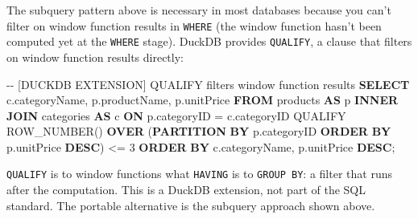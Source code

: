 \documentclass[
  letterpaper,
  DIV=11,
  numbers=noendperiod]{scrreprt}
\newenvironment{Shaded}{\begin{snugshade}}{\end{snugshade}}
\newcommand{\CommentTok}[1]{\textcolor[rgb]{0.37,0.37,0.37}{#1}}
\newcommand{\DecValTok}[1]{\textcolor[rgb]{0.68,0.00,0.00}{#1}}
\newcommand{\FunctionTok}[1]{\textcolor[rgb]{0.28,0.35,0.67}{#1}}
\newcommand{\KeywordTok}[1]{\textcolor[rgb]{0.00,0.23,0.31}{\textbf{#1}}}
\newcommand{\NormalTok}[1]{\textcolor[rgb]{0.00,0.23,0.31}{#1}}
\newcommand{\OperatorTok}[1]{\textcolor[rgb]{0.37,0.37,0.37}{#1}}
\begin{document}
\begin{tcolorbox}[enhanced jigsaw, opacitybacktitle=0.6, arc=.35mm, colback=white, bottomtitle=1mm, opacityback=0, toprule=.15mm, left=2mm, colbacktitle=quarto-callout-tip-color!10!white, breakable, coltitle=black, toptitle=1mm, colframe=quarto-callout-tip-color-frame, bottomrule=.15mm, titlerule=0mm, title=\textcolor{quarto-callout-tip-color}{\faLightbulb}\hspace{0.5em}{DuckDB's QUALIFY Clause}, rightrule=.15mm, leftrule=.75mm]

The subquery pattern above is necessary in most databases because you
can't filter on window function results in \texttt{WHERE} (the window
function hasn't been computed yet at the \texttt{WHERE} stage). DuckDB
provides \texttt{QUALIFY}, a clause that filters on window function
results directly:

\begin{codelisting}[H]

\caption{\texttt{duckdb}}

\begin{Shaded}
\begin{Highlighting}[]
\CommentTok{{-}{-} [DUCKDB EXTENSION] QUALIFY filters window function results}
\KeywordTok{SELECT}
\NormalTok{    c.categoryName,}
\NormalTok{    p.productName,}
\NormalTok{    p.unitPrice}
\KeywordTok{FROM}\NormalTok{ products }\KeywordTok{AS}\NormalTok{ p}
\KeywordTok{INNER} \KeywordTok{JOIN}\NormalTok{ categories }\KeywordTok{AS}\NormalTok{ c }\KeywordTok{ON}\NormalTok{ p.categoryID }\OperatorTok{=}\NormalTok{ c.categoryID}
\NormalTok{QUALIFY }\FunctionTok{ROW\_NUMBER}\NormalTok{() }\KeywordTok{OVER}\NormalTok{ (}\KeywordTok{PARTITION} \KeywordTok{BY}\NormalTok{ p.categoryID }\KeywordTok{ORDER} \KeywordTok{BY}\NormalTok{ p.unitPrice }\KeywordTok{DESC}\NormalTok{) }\OperatorTok{\textless{}=} \DecValTok{3}
\KeywordTok{ORDER} \KeywordTok{BY}\NormalTok{ c.categoryName, p.unitPrice }\KeywordTok{DESC}\NormalTok{;}
\end{Highlighting}
\end{Shaded}

\end{codelisting}

\texttt{QUALIFY} is to window functions what \texttt{HAVING} is to
\texttt{GROUP\ BY}: a filter that runs after the computation. This is a
DuckDB extension, not part of the SQL standard. The portable alternative
is the subquery approach shown above.

\end{tcolorbox}
\end{document}
